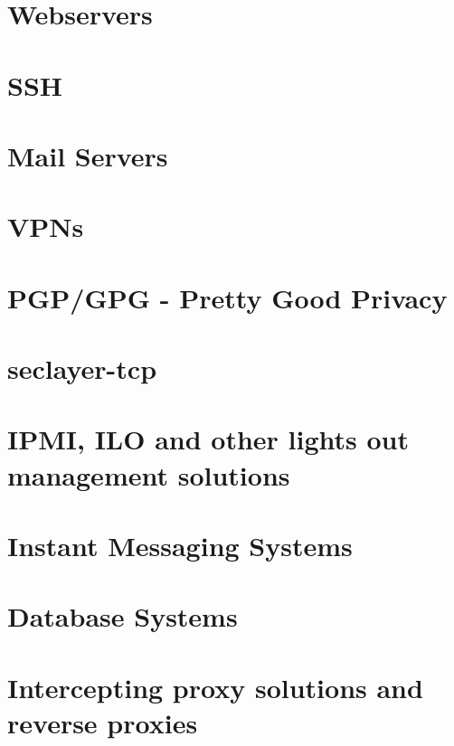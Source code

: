 
\label{section:PracticalSettings}

\section{Webservers}


\section{SSH}


\section{Mail Servers}



\section{VPNs}



\section{PGP/GPG - Pretty Good Privacy}



\section{seclayer-tcp}



\section{IPMI, ILO and other lights out management solutions}





\section{Instant Messaging Systems}



\section{Database Systems}



\section{Intercepting proxy solutions and reverse proxies}
 



